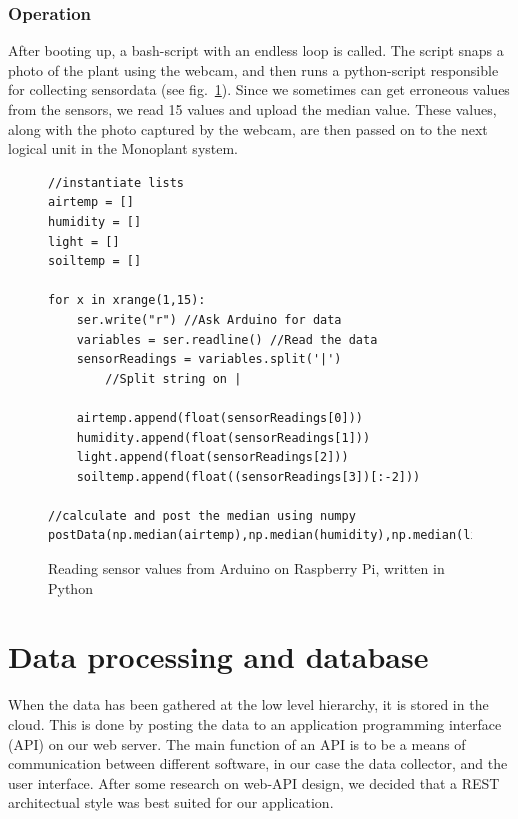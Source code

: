 \subsubsection{Operation}
After booting up, a bash-script with an endless loop is called. The script snaps a photo of the plant using the webcam, and then runs a python-script responsible for collecting sensordata (see fig.~\ref{fig:Raspberrycode}). Since we sometimes can get erroneous values from the sensors, we read 15 values and upload the median value. These values, along with the photo captured by the webcam, are then passed on to the next logical unit in the Monoplant system. 

\begin{figure}
	\begin{lstlisting}[style=htmlcssjs]
//instantiate lists
airtemp = []
humidity = []
light = []
soiltemp = [] 

for x in xrange(1,15): 
	ser.write("r") //Ask Arduino for data
	variables = ser.readline() //Read the data
	sensorReadings = variables.split('|') 
		//Split string on |

	airtemp.append(float(sensorReadings[0]))
	humidity.append(float(sensorReadings[1]))
	light.append(float(sensorReadings[2]))
	soiltemp.append(float((sensorReadings[3])[:-2])) 

//calculate and post the median using numpy
postData(np.median(airtemp),np.median(humidity),np.median(light),np.median(soiltemp)) 
	\end{lstlisting}
\caption{Reading sensor values from Arduino on Raspberry Pi, written in Python}
\label{fig:Raspberrycode}
\end{figure}

\section{Data processing and database}
When the data has been gathered at the low level hierarchy, it is stored in the cloud. This is done by posting the data to an application programming interface (API) on our web server. The main function of an API is to be a means of communication between different software, in our case the data collector, and the user interface. After some research on web-API design, we decided that a REST architectual style was best suited for our application. 

